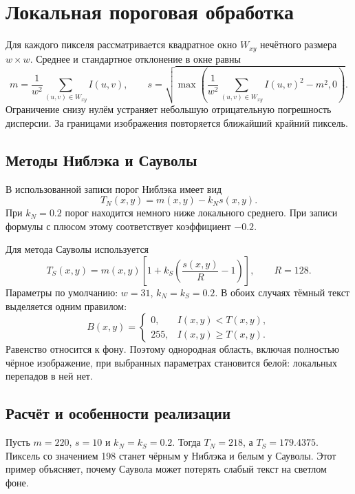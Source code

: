 \documentclass[12pt,a4paper]{extarticle}
\begin{document}
\clearpage
\section{Локальная пороговая обработка}
Для каждого пикселя рассматривается квадратное окно $W_{xy}$ нечётного размера $w\times w$. Среднее и стандартное отклонение в окне равны
\begin{equation}
 m=\frac{1}{w^2}\sum_{(u,v)\in W_{xy}}I(u,v),\qquad
 s=\sqrt{\max\left(\frac{1}{w^2}\sum_{(u,v)\in W_{xy}}I(u,v)^2-m^2,0\right)}.
\end{equation}
Ограничение снизу нулём устраняет небольшую отрицательную погрешность дисперсии. За границами изображения повторяется ближайший крайний пиксель.

\subsection{Методы Ниблэка и Сауволы}
В использованной записи порог Ниблэка имеет вид
\begin{equation}
 T_N(x,y)=m(x,y)-k_Ns(x,y).
\end{equation}
При $k_N=0.2$ порог находится немного ниже локального среднего. При записи формулы с плюсом этому соответствует коэффициент $-0.2$.

Для метода Сауволы используется
\begin{equation}
 T_S(x,y)=m(x,y)\left[1+k_S\left(\frac{s(x,y)}{R}-1\right)\right],\qquad R=128.
\end{equation}
Параметры по умолчанию: $w=31$, $k_N=k_S=0.2$. В обоих случаях тёмный текст выделяется одним правилом:
\begin{equation}
 B(x,y)=\begin{cases}0,&I(x,y)<T(x,y),\\255,&I(x,y)\ge T(x,y).\end{cases}
\end{equation}
Равенство относится к фону. Поэтому однородная область, включая полностью чёрное изображение, при выбранных параметрах становится белой: локальных перепадов в ней нет.

\subsection{Расчёт и особенности реализации}
Пусть $m=220$, $s=10$ и $k_N=k_S=0.2$. Тогда $T_N=218$, а $T_S=179.4375$. Пиксель со значением 198 станет чёрным у Ниблэка и белым у Сауволы. Этот пример объясняет, почему Саувола может потерять слабый текст на светлом фоне.
\end{document}
